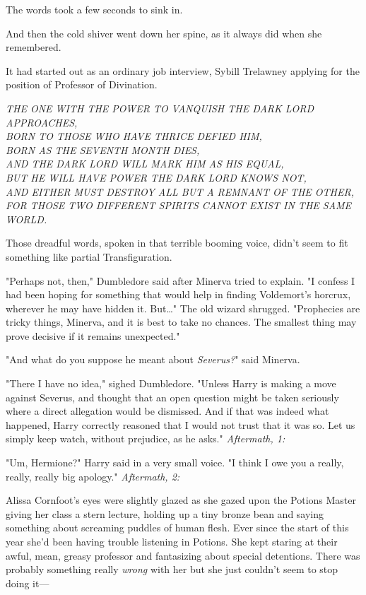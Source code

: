The words took a few seconds to sink in.

And then the cold shiver went down her spine, as it always did when she 
remembered.

It had started out as an ordinary job interview, Sybill Trelawney applying for 
the position of Professor of Divination.

\emph{THE ONE WITH THE POWER TO VANQUISH THE DARK LORD APPROACHES,\\
BORN TO THOSE WHO HAVE THRICE DEFIED HIM,\\
BORN AS THE SEVENTH MONTH DIES,\\
AND THE DARK LORD WILL MARK HIM AS HIS EQUAL,\\
BUT HE WILL HAVE POWER THE DARK LORD KNOWS NOT,\\
AND EITHER MUST DESTROY ALL BUT A REMNANT OF THE OTHER,\\
FOR THOSE TWO DIFFERENT SPIRITS CANNOT EXIST IN THE SAME WORLD.}

Those dreadful words, spoken in that terrible booming voice, didn't seem to fit 
something like partial Transfiguration.

"Perhaps not, then," Dumbledore said after Minerva tried to explain. "I confess 
I had been hoping for something that would help in finding Voldemort's horcrux, 
wherever he may have hidden it. But{\ldots}" The old wizard shrugged. 
"Prophecies are tricky things, Minerva, and it is best to take no chances. The 
smallest thing may prove decisive if it remains unexpected."

"And what do you suppose he meant about \emph{Severus?}" said Minerva.

"There I have no idea," sighed Dumbledore. "Unless Harry is making a move 
against Severus, and thought that an open question might be taken seriously 
where a direct allegation would be dismissed. And if that was indeed what 
happened, Harry correctly reasoned that I would not trust that it was so. Let 
us simply keep watch, without prejudice, as he asks."
\sbreak
\emph{Aftermath, 1:}

"Um, Hermione?" Harry said in a very small voice. "I think I owe you a really, 
really, really big apology."
\sbreak
\emph{Aftermath, 2:}

Alissa Cornfoot's eyes were slightly glazed as she gazed upon the Potions 
Master giving her class a stern lecture, holding up a tiny bronze bean and 
saying something about screaming puddles of human flesh. Ever since the start 
of this year she'd been having trouble listening in Potions. She kept staring 
at their awful, mean, greasy professor and fantasizing about special 
detentions. There was probably something really \emph{wrong} with her but she 
just couldn't seem to stop doing it---

